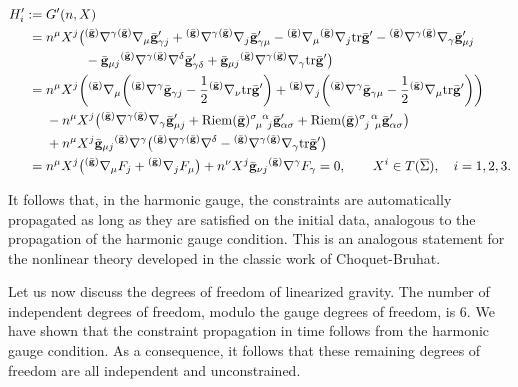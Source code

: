 \documentclass[11pt]{article}
\numberwithin{equation}{section}
\def\olin#1{\overline{#1}{}}%
\def\grad{{\nabla}}%
\newcommand{\leftexp}[2]{{\vphantom{#2}}^{#1}{#2}}
\def\halb{\frac{1}{2}}%
\def \gm{\gamma}
\def \a{\alpha}
\renewcommand{\gg}{{\bf g}}
\newcommand{\bgg}{{\bar{\bf g}}}
\renewcommand{\a}{\alpha}
\renewcommand{\d}{\delta}
\numberwithin{equation}{section}
\begin{document}
\begin{align*}
 H'_i :={}& G' (n, X) \notag\\
 ={}& n^\mu X^j \bigl(\leftexp{(\bgg)}{\grad}^\gm \leftexp{(\bgg)}{\grad}_\mu \bgg'_{ \gm j} + \leftexp{(\bgg)}{\grad}^\gm \leftexp{(\bgg)}{\grad}_j \bgg'_{\gm \mu} - \leftexp{(\bgg)}{\grad}_\mu \leftexp{(\bgg)}{\grad}_j {\rm tr}\bgg' - \leftexp{(\bgg)}{\grad}^\gm \leftexp{(\bgg)}{\grad}_\gm \bgg'_{ \mu j} \notag\\
 & \hphantom{n^\mu X^j \bigl(}{} - \bgg_{\mu j} \leftexp{(\bgg)}{\grad}^\gm \leftexp{(\bgg)}{\grad}^\d \bgg'_{ \gm \d} + \bgg_{\mu j} \leftexp{(\bgg)}{\grad}^\gm \leftexp{(\bgg)}{\grad}_\gm {\rm tr} \bgg' \bigr) \notag\\
 ={}& n^\mu X^j \biggl(\leftexp{(\bgg)}{\grad}_\mu \biggl(\leftexp{(\bgg)}{\grad}^\gm \bgg_{\gm j} - \halb \leftexp{(\bgg)}{\grad}_\nu {\rm tr}\bgg' \biggr) + \leftexp{(\bgg)}{\grad}_j \biggl(\leftexp{(\bgg)}{\grad}^\gm \bgg_{\gm \mu} - \halb \leftexp{(\bgg)}{\grad}_\mu {\rm tr}\bgg' \biggr) \biggr) \notag\\
 & - n^\mu X^j \bigl(\leftexp{(\bgg)}{\grad}^\gm \leftexp{(\bar{\gg})}{\grad}_\gm \bgg'_{\mu j} + {\rm Riem}(\bgg)^{\sigma \,\,\,\a}_{\,\,\,\mu\,\,\,j} \bgg'_{\a \sigma} + {\rm Riem}(\bgg)^{\sigma \,\,\,\a}_{\,\,\,j\,\,\,\mu} \bgg'_{\a \sigma} \bigr) \notag\\
 & + n^ \mu X^j \bgg_{ \mu j} \leftexp{(\bgg)}{\grad}^\gm \bigl(\leftexp{(\bgg)}{\grad}^\gm \leftexp{(\bgg)}{\grad}^\d - \leftexp{(\bgg)}{\grad}^\gm \leftexp{(\bgg)}{\grad}_\gm {\rm tr}\bgg' \bigr)
 \notag\\
 ={}& n^ \mu X^j \bigl(\leftexp{(\bgg)}{\grad}_\mu F_j + \leftexp{(\bgg)}{\grad}_j F_\mu \bigr) + n^\nu X^j \bgg_{ \nu j} \leftexp{(\bgg)}{\grad}^\gm F_\gm =0, \qquad X^i \in T(\olin{\Sigma}),\quad i= 1, 2, 3.
\end{align*}

It follows that, in the harmonic gauge, the constraints are automatically propagated as long as they are satisfied on the initial data, analogous to the propagation of the harmonic gauge condition. This is an analogous statement for the nonlinear theory developed in the classic work of Choquet-Bruhat.

Let us now discuss the degrees of freedom of linearized gravity. The number of independent
degrees of freedom, modulo the gauge degrees of freedom, is 6. We have shown that the constraint propagation in time follows from the harmonic gauge condition. As a consequence, it follows that these remaining degrees of freedom are all independent and unconstrained.
\end{document}
